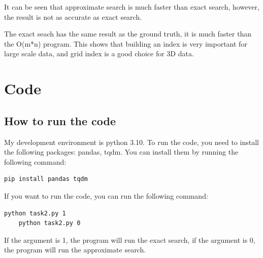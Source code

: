 \documentclass{article}
\begin{document}
It can be seen that approximate search is much faster than exact search, however, the result is not as accurate as exact search.

The exact seach has the same result as the ground truth, it is much faster than the O(m*n) program. This shows that building an index is very important for large scale data, and grid index is a good choice for 3D data.

\section{Code}
\subsection{How to run the code}
My development environment is python 3.10. To run the code, you need to install the following packages:
pandas, tqdm. You can install them by running the following command:
\begin{lstlisting}[language=bash]
    pip install pandas tqdm
\end{lstlisting}

If you want to run the code, you can run the following command:
\begin{lstlisting}[language=bash]
    python task2.py 1
    python task2.py 0
\end{lstlisting}

If the argument is 1, the program will run the exact search, if the argument is 0, the program will run the approximate search.
\end{document}

